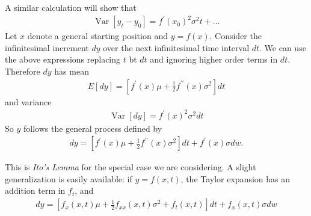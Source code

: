 \documentclass[\topdir/lecture\_notes.tex]{subfiles}
\begin{document}
A similar calculation will show that
\begin{align*}
\operatorname{Var}\left[y_{t}-y_{0}\right]=f^{\prime}\left(x_{0}\right)^{2} \sigma^{2} t+\ldots
\end{align*}
Let \(x\) denote a general starting position and \(y=f(x)\). Consider the infinitesimal increment \(d y\) over the next infinitesimal time interval \(dt\). We can use the above expressions replacing \(t\) bt \(dt\) and ignoring higher order terms in \(dt\). Therefore \(d y\) has mean
\begin{align*}
E[d y]=\left[f^{\prime}(x) \mu+\frac{1}{2} f^{\prime \prime}(x) \sigma^{2}\right] dt
\end{align*}
and variance
\begin{align*}
\operatorname{Var}[d y]=f^{\prime}(x)^{2} \sigma^{2} dt
\end{align*}
So \(y\) follows the general process defined by
\begin{align}
d y=\left[f^{\prime}(x) \mu+\frac{1}{2} f^{\prime \prime}(x) \sigma^{2}\right] dt+f^{\prime}(x) \sigma dw . \label{eq:ito_lemma_simple}
\end{align}

This is \emph{Ito's Lemma} for the special case we are considering. A slight generalization is easily available: if \(y=f(x, t)\), the Taylor expansion has an addition term in \(f_{t}\), and
\begin{align}
d y=\left[f_{x}(x, t) \mu+\frac{1}{2} f_{x x}(x, t) \sigma^{2}+f_{t}(x, t)\right] dt+f_{x}(x, t) \sigma dw
\end{align}
\end{document}
